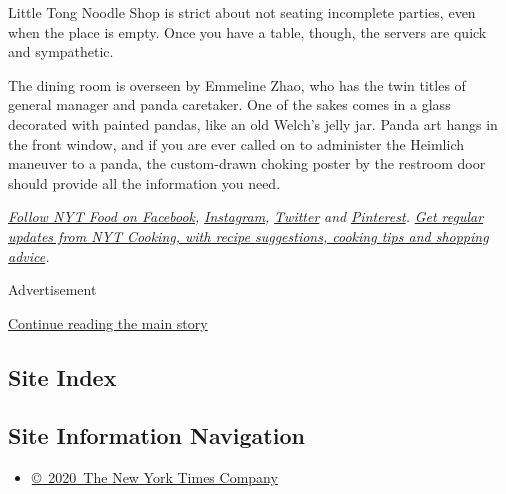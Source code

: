 Little Tong Noodle Shop is strict about not seating incomplete parties,
even when the place is empty. Once you have a table, though, the servers
are quick and sympathetic.

The dining room is overseen by Emmeline Zhao, who has the twin titles of
general manager and panda caretaker. One of the sakes comes in a glass
decorated with painted pandas, like an old Welch's jelly jar. Panda art
hangs in the front window, and if you are ever called on to administer
the Heimlich maneuver to a panda, the custom-drawn choking poster by the
restroom door should provide all the information you need.

\href{https://www.facebookcorewwwi.onion/nytfood/}{\emph{Follow NYT Food
on Facebook}}\emph{,}
\href{https://instagram.com/nytfood}{\emph{Instagram}}\emph{,}
\href{https://twitter.com/nytfood}{\emph{Twitter}} \emph{and}
\href{https://www.pinterest.com/nytfood/}{\emph{Pinterest}}\emph{.}
\href{https://www.nytimes3xbfgragh.onion/newsletters/cooking}{\emph{Get
regular updates from NYT Cooking, with recipe suggestions, cooking tips
and shopping advice}}\emph{.}

Advertisement

\protect\hyperlink{after-bottom}{Continue reading the main story}

\hypertarget{site-index}{%
\subsection{Site Index}\label{site-index}}

\hypertarget{site-information-navigation}{%
\subsection{Site Information
Navigation}\label{site-information-navigation}}

\begin{itemize}
\tightlist
\item
  \href{https://help.nytimes3xbfgragh.onion/hc/en-us/articles/115014792127-Copyright-notice}{©~2020~The
  New York Times Company}
\end{itemize}

